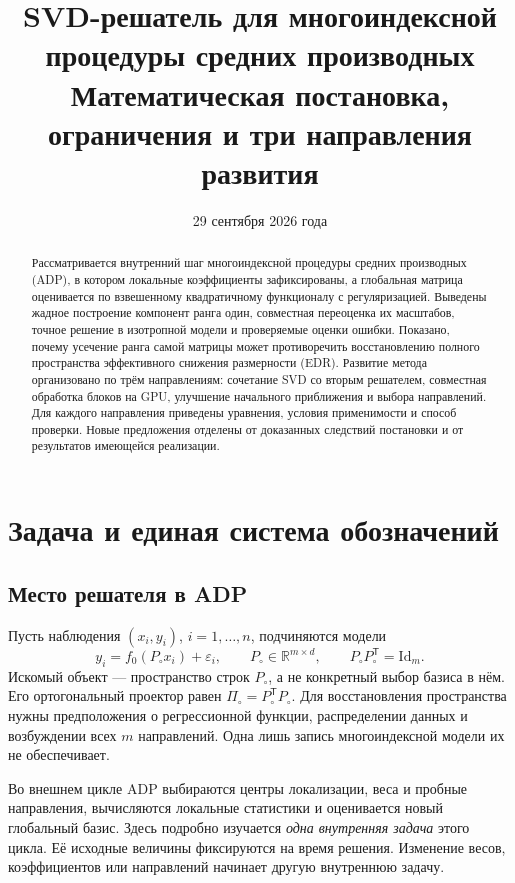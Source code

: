 \documentclass[11pt,a4paper]{article}
\title{SVD-решатель для многоиндексной\allowbreak{} процедуры средних производных\\[5pt]
  \large Математическая постановка, ограничения\allowbreak{} и три направления развития}
\author{}
\date{29 сентября 2026 года}
\numberwithin{equation}{section}
\theoremstyle{remark}
\newcommand{\R}{\mathbb R}
\newcommand{\Id}{\mathrm{Id}}
\newcommand{\T}{^{\mathsf T}}
\begin{document}
\maketitle
\begin{abstract}
Рассматривается внутренний шаг многоиндексной процедуры средних производных
(ADP), в котором локальные коэффициенты зафиксированы, а глобальная матрица
оценивается по взвешенному квадратичному функционалу с регуляризацией.
Выведены жадное построение компонент ранга один, совместная переоценка их
масштабов, точное решение в изотропной модели и проверяемые оценки ошибки.
Показано, почему усечение ранга самой матрицы может противоречить восстановлению
полного пространства эффективного снижения размерности (EDR).
Развитие метода организовано по трём направлениям: сочетание SVD со вторым
решателем, совместная обработка блоков на GPU, улучшение начального приближения и
выбора направлений. Для каждого направления приведены уравнения, условия
применимости и способ проверки. Новые предложения отделены от доказанных
следствий постановки и от результатов имеющейся реализации.
\end{abstract}
\tableofcontents
\newpage

\section{Задача и единая система обозначений}\label{sec:setup}

\subsection{Место решателя в ADP}
Пусть наблюдения $(x_i,y_i)$, $i=1,\ldots,n$, подчиняются модели
\[
  y_i=f_0(P_\circ x_i)+\varepsilon_i,
  \qquad P_\circ\in\R^{m\times d},\qquad P_\circ P_\circ\T=\Id_m.
\]
Искомый объект --- пространство строк $P_\circ$, а не конкретный выбор
базиса в нём. Его ортогональный проектор равен
$\Pi_\circ=P_\circ\T P_\circ$. Для восстановления пространства нужны
предположения о регрессионной функции, распределении данных и возбуждении
всех $m$ направлений. Одна лишь запись многоиндексной модели их не обеспечивает.

Во внешнем цикле ADP выбираются центры локализации, веса и пробные
направления, вычисляются локальные статистики и оценивается новый глобальный
базис. Здесь подробно изучается \emph{одна внутренняя задача} этого цикла.
Её исходные величины фиксируются на время решения. Изменение весов,
коэффициентов или направлений начинает другую внутреннюю задачу.
\end{document}

